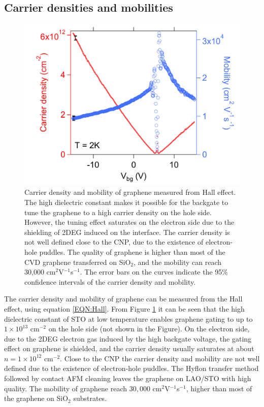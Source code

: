 \documentclass[pdflatex, sectionletters, 12pt, final, phd]{pittetd}    %
\begin{document}
\subsection{Carrier densities and mobilities}
\label{SEC:CarrierDensityMobility}
\begin{figure}[h!]
	\centering
	\includegraphics[width=.65\textwidth]{Drawing/CarrierDensityMobility.pdf}
	\caption[Carrier density and mobility of graphene measured from Hall effect]{Carrier density and mobility of graphene measured from Hall effect. The high dielectric constant makes it possible for the backgate to tune the graphene to a high carrier density on the hole side. However, the tuning effect saturates on the electron side due to the shielding of 2DEG induced on the interface. The carrier density is not well defined close to the CNP, due to the existence of electron-hole puddles. The quality of graphene is higher than most of the CVD graphene transferred on SiO$_2$, and the mobility can reach 30,000 cm$^2$V$^{-1}$s$^{-1}$. The error bars on the curves indicate the 95\% confidence intervals of the carrier density and mobility.}
	\label{FIG:CarrierDensityMobility}
\end{figure}

The carrier density and mobility of graphene can be measured from the Hall effect, using equation \ref{EQN:Hall}. From Figure \ref{FIG:CarrierDensityMobility} it can be seen that the high dielectric constant of STO at low temperature enables graphene gating to up to $1 \times 10^{13}$ $\mathrm{cm}^{-2}$ on the hole side (not shown in the Figure). On the electron side, due to the 2DEG electron gas induced by the high backgate voltage, the gating effect on graphene is shielded, and the carrier density usually saturates at about $n = 1 \times 10^{12}$ $\mathrm{cm}^{-2}$. Close to the CNP the carrier density and mobility are not well defined due to the existence of electron-hole puddles. The Hyflon transfer method followed by contact AFM cleaning leaves the graphene on LAO/STO with high quality. The mobility of graphene reach $30,000$ cm$^{2}$V$^{-1}$s$^{-1}$, higher than most of the graphene on SiO$_2$ substrates\cite{li2016method, li2018high}. 
\end{document}
